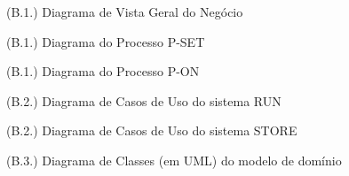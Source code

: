 \documentclass[12pt,a4paper]{article}
\begin{document}
\begin{landscape}
  \begin{figure}
    \centering
    
    \caption{(B.1.) Diagrama de Vista Geral do Negócio}
    \label{fig:archimate}
  \end{figure}
\end{landscape}

\begin{landscape}
  \begin{figure}
    \centering
    
    \caption{(B.1.) Diagrama do Processo P-SET}
    \label{fig:p-set-bpmn}
  \end{figure}
\end{landscape}

\begin{landscape}
  \begin{figure}
    \centering
    
    \caption{(B.1.) Diagrama do Processo P-ON}
    \label{fig:p-on-bpmn}
  \end{figure}
\end{landscape}

\begin{landscape}
  \begin{figure}
    \centering
    
    \caption{(B.2.) Diagrama de Casos de Uso do sistema RUN}
    \label{fig:uc-run}
  \end{figure}
\end{landscape}

\begin{landscape}
  \begin{figure}
    \centering
    
    \caption{(B.2.) Diagrama de Casos de Uso do sistema STORE}
    \label{fig:uc-store}
  \end{figure}
\end{landscape}

\begin{landscape}
  \begin{figure}
    \centering
    
    \caption{(B.3.) Diagrama de Classes (em UML) do modelo de domínio}
    \label{fig:uml}
  \end{figure}
\end{landscape}
\end{document}
